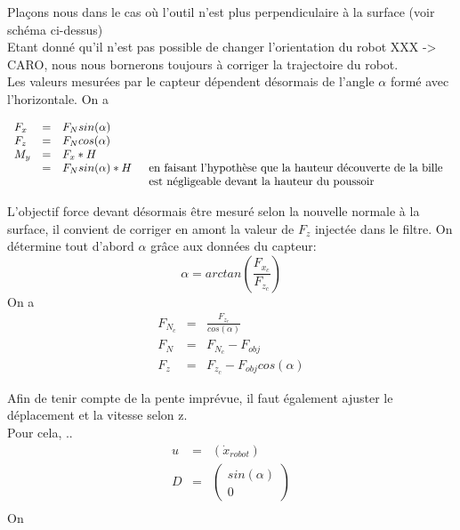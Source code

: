 \documentclass[12pt,twoside,a4paper]{article}
\begin{document}
\vspace{1cm}
Plaçons nous dans le cas où l'outil n'est plus perpendiculaire à la surface (voir schéma ci-dessus)\\

Etant donné qu'il n'est pas possible de changer l'orientation du robot XXX -> CARO, nous nous bornerons toujours à corriger la trajectoire du robot. \\

\vspace{1cm}
Les valeurs mesurées par le capteur dépendent désormais de l'angle $\alpha$ formé avec l'horizontale. On a 

$$
\begin{array}{llll}
F_x &=& F_N sin(\alpha) &\\
F_z &=& F_N cos(\alpha) &\\
M_y &= &F_x*H &\\
	&= &F_N sin(\alpha)*H &
	\begin{array}[t]{l}
	\text{en faisant l'hypothèse que la hauteur découverte de la bille} \\ 
	\text{est négligeable devant la hauteur du poussoir}
	\end{array}
\end{array}
$$

L'objectif force devant désormais être mesuré selon la nouvelle normale à la surface, il convient de corriger en amont la valeur de $F_z$ injectée dans le filtre. 
On détermine tout d'abord $\alpha$ grâce aux données du capteur:
$$ \alpha = arctan(\frac{F_{x_c}}{F_{z_c}}) $$
On a 
$$
\begin{array}{lll}
F_{N_c} &=& \frac{F_{z_c}}{cos(\alpha)}  \\
F_N &=& F_{N_c}-F_{obj} \\
F_z &=& F_{z_c}-F_{obj}cos(\alpha)
\end{array}
$$

Afin de tenir compte de la pente imprévue, il faut également ajuster le déplacement et la vitesse selon z. \\
Pour cela, ..
$$ 
\begin{array}{lll}
u &=& (\dot{x}_{robot}) \\
D &=& \begin{pmatrix}
sin(\alpha)\\
0
\end{pmatrix} \\
\end{array}
$$
On 
\end{document}
